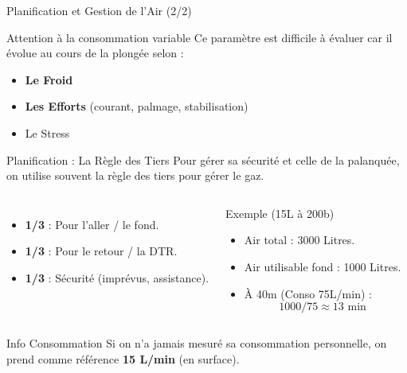 \begin{frame}{Planification et Gestion de l'Air (2/2)}
    \begin{block}{Attention à la consommation variable}
        Ce paramètre est difficile à évaluer car il évolue au cours de la plongée selon :
        \begin{itemize}
            \item \textbf{Le Froid}
            \item \textbf{Les Efforts} (courant, palmage, stabilisation)
            \item Le Stress
        \end{itemize}
    \end{block}

\end{frame}

\begin{frame}{Planification : La Règle des Tiers}
    Pour gérer sa sécurité et celle de la palanquée, on utilise souvent la règle des tiers pour gérer le gaz.

    \begin{columns}
        \begin{itemize}
            \item \textbf{1/3} : Pour l'aller / le fond.
            \item \textbf{1/3} : Pour le retour / la DTR.
            \item \textbf{1/3} : Sécurité (imprévus, assistance).
        \end{itemize}
       
        \begin{block}{Exemple (15L à 200b)}
            \begin{itemize}
                \item Air total : 3000 Litres.
                \item Air utilisable fond : 1000 Litres.
                \item À 40m (Conso 75L/min) :
                $$ 1000 / 75 \approx 13 \text{ min} $$
            \end{itemize}
        \end{block}
    \end{columns}

    \begin{alertblock}{Info Consommation}
        Si on n'a jamais mesuré sa consommation personnelle, on prend comme référence \textbf{15 L/min} (en surface).
    \end{alertblock}
\end{frame}
